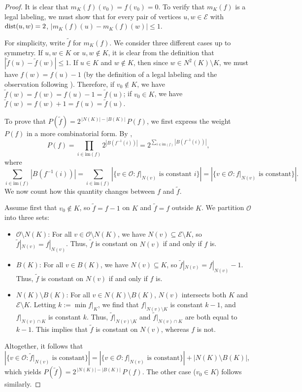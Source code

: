 \documentclass{amsart}
\theoremstyle{definition}
\newcommand{\cO}{\mathcal{O} }
\newcommand{\cE}{\mathcal{E} }
\newcommand{\0}[0]{\emptyset}
\newcommand{\dist}[0]{\mbox{\rm{dist}}}
\begin{document}
\begin{proof} 
It is clear that $m_K(f)(v_0)=f(v_0)=0$. To verify that $m_K(f)$ is a legal labeling, we must show that for every pair of vertices $u,w\in \cE$ with $\dist(u,w)=2$, $|m_K(f)(u)-m_K(f)(w)|\leq 1$. 

For simplicity, write $\widetilde{f}$ for $m_K(f)$. We consider three different cases up to symmetry. If $u,w\in K$ or $u,w\notin K$, it is clear from the definition that $|\widetilde{f}(u)-\widetilde{f}(w)|\leq 1$. If $u\in K$ and $w\notin K$, then since $w\in N^2(K)\setminus K$, we must have $f(w)=f(u)-1$ (by the definition of a legal labeling and the observation following ). Therefore, if $v_0\notin K$, we have $\widetilde{f}(w)=f(w)=f(u)-1=\widetilde{f}(u)$; if $v_0\in K$, we have $\widetilde{f}(w)=f(w)+1=f(u)=\widetilde{f}(u)$.

To prove that $P(\widetilde{f})=2^{\,|N(K)|-|B(K)|}\,P(f)$, we first express the weight $P(f)$ in a more combinatorial form. By ,
\[
P(f) =\prod_{i\in\mathrm{im}(f)}2^{|B(f^{-1}(i))|}= 2^{\sum_{i \in \mathrm{im}(f)} |B(f^{-1}(i))|},
\]
where
\[
\sum_{i \in \mathrm{im}(f)} |B(f^{-1}(i))|= \sum_{i \in \mathrm{im}(f)}|\{v\in\cO: \text{$f|_{N(v)}$ is constant } i\}|= |\{v\in\cO: \text{$f|_{N(v)}$ is constant}\}|.
\]
We now count how this quantity changes between $f$ and $\widetilde{f}$. 

Assume first that $v_0 \notin K$, so $\widetilde{f} = f - 1$ on $K$ and $\widetilde{f} = f$ outside $K$. We partition $\cO$ into three sets:
\begin{itemize}
    \item $\cO\setminus N(K)$: For all $v\in \cO\setminus N(K)$, we have $N(v) \subseteq \cE\setminus K$, so $\widetilde{f}|_{N(v)} = f|_{N(v)}$. Thus, $\widetilde{f}$ is constant on $N(v)$ if and only if $f$ is.
    \item $B(K)$: For all $v\in B(K)$, we have $N(v) \subseteq K$, so $\widetilde{f}|_{N(v)} = f|_{N(v)} - 1$. Thus, $\widetilde{f}$ is constant on $N(v)$ if and only if $f$ is.
    \item $N(K) \setminus B(K)$: For all $v\in N(K) \setminus B(K)$, $N(v)$ intersects both $K$ and $\cE \setminus K$. Letting $k:=\min f|_K$, we find that $f|_{N(v)\setminus K}$ is constant $k-1$, and $f|_{N(v)\cap K}$ is constant $k$. Thus, $\widetilde{f}|_{N(v)\setminus K}$ and $\widetilde{f}|_{N(v)\cap K}$ are both equal to $k-1$. This implies that $\widetilde{f}$ is constant on $N(v)$, whereas $f$ is not.
\end{itemize}
Altogether, it follows that $|\{v\in\cO: \text{$\widetilde{f}|_{N(v)}$ is constant}\}| = |\{v\in\cO: \text{$f|_{N(v)}$ is constant}\}| + |N(K)\setminus B(K)|$, which yields $P(\widetilde{f})=2^{\,|N(K)|-|B(K)|}\,P(f)$. The other case ($v_0\in K$) follows similarly.
\end{proof}
\end{document}
